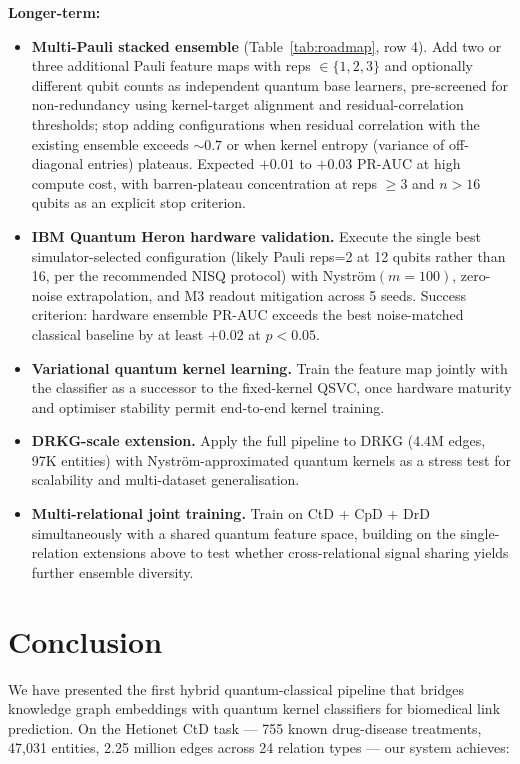 \documentclass[twocolumn,10pt]{article}
\begin{document}
\vspace{0.6em}
\noindent\textbf{Longer-term:}
\begin{itemize}[leftmargin=*]
\item \textbf{Multi-Pauli stacked ensemble} (Table~\ref{tab:roadmap}, row 4). Add two or three additional Pauli feature maps with reps $\in \{1, 2, 3\}$ and optionally different qubit counts as independent quantum base learners, pre-screened for non-redundancy using kernel-target alignment and residual-correlation thresholds; stop adding configurations when residual correlation with the existing ensemble exceeds $\sim 0.7$ or when kernel entropy (variance of off-diagonal entries) plateaus. Expected $+0.01$ to $+0.03$ PR-AUC at high compute cost, with barren-plateau concentration at reps $\ge 3$ and $n > 16$ qubits as an explicit stop criterion.
\item \textbf{IBM Quantum Heron hardware validation.} Execute the single best simulator-selected configuration (likely Pauli reps=2 at 12 qubits rather than 16, per the recommended NISQ protocol) with Nystr\"{o}m$(m = 100)$, zero-noise extrapolation, and M3 readout mitigation across 5 seeds. Success criterion: hardware ensemble PR-AUC exceeds the best noise-matched classical baseline by at least $+0.02$ at $p < 0.05$.
\item \textbf{Variational quantum kernel learning.} Train the feature map jointly with the classifier as a successor to the fixed-kernel QSVC, once hardware maturity and optimiser stability permit end-to-end kernel training.
\item \textbf{DRKG-scale extension.} Apply the full pipeline to DRKG (4.4M edges, 97K entities) with Nystr\"{o}m-approximated quantum kernels as a stress test for scalability and multi-dataset generalisation.
\item \textbf{Multi-relational joint training.} Train on CtD + CpD + DrD simultaneously with a shared quantum feature space, building on the single-relation extensions above to test whether cross-relational signal sharing yields further ensemble diversity.
\end{itemize}

\section{Conclusion}

We have presented the first hybrid quantum-classical pipeline that bridges knowledge graph embeddings with quantum kernel classifiers for biomedical link prediction. On the Hetionet CtD task --- 755 known drug-disease treatments, 47,031 entities, 2.25 million edges across 24 relation types --- our system achieves:
\end{document}
